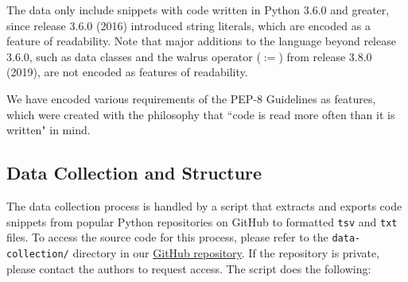 \documentclass[11pt]{article}
\begin{document}
The data only include snippets with code written in Python 3.6.0 and greater, since release 3.6.0 (2016) introduced string literals, which are encoded as a feature of readability. Note that major additions to the language beyond release 3.6.0, such as data classes and the walrus operator ($:=$) from release 3.8.0 (2019), are not encoded as features of readability.

We have encoded various requirements of the PEP-8 Guidelines \cite{pep8_doc} as features, which were created with the philosophy that ``code is read more often than it is written" in mind.

\subsection{Data Collection and Structure}

The data collection process is handled 
by a script that extracts and exports code snippets from popular Python repositories on GitHub to formatted \texttt{tsv} and \texttt{txt} files. To access the source code for this process, please refer to the \texttt{data-collection/} directory in our \href{https://github.com/willtholke/annotation-project/tree/main/data-collection}{\color{blue}GitHub repository}. If the repository is private, please contact the authors to request access. The script does the following:

\vspace{-2.5mm}
\end{document}
